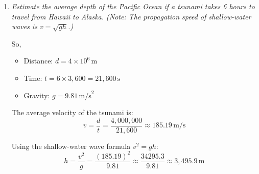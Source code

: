 \documentclass[a4paper,12pt]{letter}
\begin{document}
\begin{enumerate}
\begin{center}
\end{center}


\item \textit{Estimate the average depth of the Pacific Ocean if a tsunami takes 6 hours to travel from Hawaii to Alaska. (Note: The propagation speed of shallow-water waves is $v=\sqrt{gh}$.)}


So,
\begin{itemize}
    \item Distance: $d = 4 \times 10^6\,\text{m}$
    \item Time: $t = 6 \times 3,600 = 21,600\,\text{s}$
    \item Gravity: $g = 9.81\,\text{m/s}^2$
\end{itemize}

The average velocity of the tsunami is:
\begin{equation}
    v = \frac{d}{t} = \frac{4,000,000}{21,600} \approx 185.19\,\text{m/s}
\end{equation}

Using the shallow-water wave formula $v^2 = gh$:
\begin{equation}
    h = \frac{v^2}{g} = \frac{(185.19)^2}{9.81} \approx \frac{34295.3}{9.81} \approx 3,495.9\,\text{m}
\end{equation}

\begin{center}
\end{center}
\end{enumerate}
\end{document}
